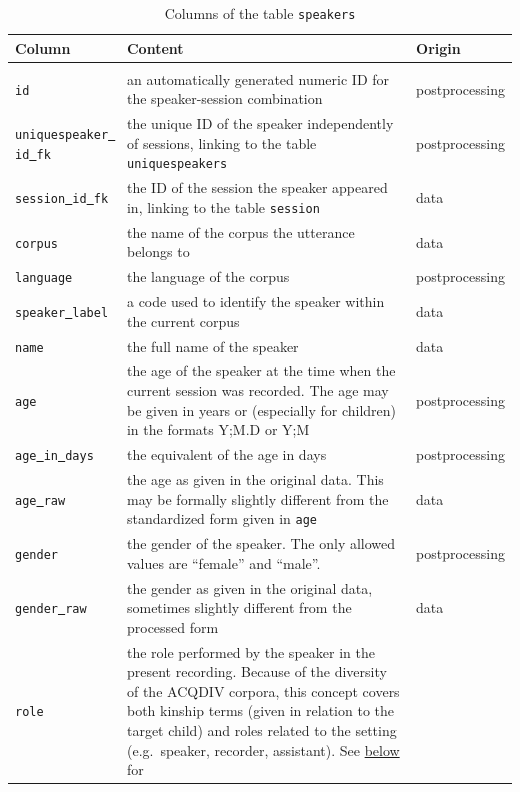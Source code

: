 \documentclass[a4paper, 11pt]{book}
\newcommand{\und}{\underline{{ }}\hspace{0.2mm}}	%
\begin{document}
\begin{longtable}{lp{.5\linewidth}p{.2\linewidth}}
	\toprule
		\textbf{Column} & \textbf{Content} 	& \textbf{Origin} \\
	\midrule
	\endhead
	
	\bottomrule\\[-0.15cm]
	\caption{Columns of the table \texttt{speakers}}
	\endfoot
	
		\texttt{id}				& an automatically generated numeric ID for the speaker-session combination & postprocessing \\
		\texttt{uniquespeaker\und id\und fk} & the unique ID of the speaker independently of sessions, linking to the table \texttt{uniquespeakers} & postprocessing \\
		\texttt{session\und id\und fk} & the ID of the session the speaker appeared in, linking to the table \texttt{session} & data \\
		\texttt{corpus}			& the name of the corpus the utterance belongs to & data \\
		\texttt{language}		& the language of the corpus & postprocessing \\
		\texttt{speaker\und label} & a code used to identify the speaker within the current corpus & data \\
		\texttt{name} 			& the full name of the speaker & data \\
		\texttt{age} 			& the age of the speaker at the time when the current session was recorded. The age may be given in years
			 					  or (especially for children) in the formats Y;M.D or Y;M & postprocessing \\
		\texttt{age\und in\und days} & the equivalent of the age in days & postprocessing \\
		\texttt{age\und raw} 	& the age as given in the original data. This may be formally slightly different from the standardized form
			 					  given in \texttt{age} & data \\
		\texttt{gender} 		& the gender of the speaker. The only allowed values are “female” and “male”. & postprocessing \\
		\texttt{gender\und raw} & the gender as given in the original data, sometimes slightly different from the processed form & data \\
		\texttt{role} 			& the role performed by the speaker in the present recording. Because of the diversity of the ACQ\-DIV corpora, 
			 					  this concept covers both kinship terms (given in relation to the target child) and roles related to the 
								  setting (e.g.\ speaker, recorder, assistant). See \hyperref[subsec:Roles and macroroles]{below} for 

\end{longtable}
\end{document}
